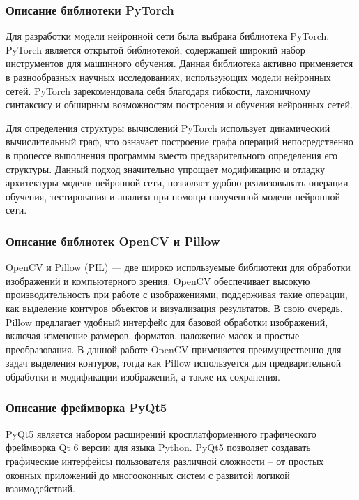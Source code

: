 \subsubsection{Описание библиотеки PyTorch}
	
Для разработки модели нейронной сети была выбрана библиотека PyTorch. PyTorch является открытой библиотекой, содержащей широкий	набор инструментов для машинного обучения. Данная библиотека активно применяется в разнообразных научных исследованиях, использующих модели нейронных сетей. PyTorch зарекомендовала себя благодаря гибкости, лаконичному синтаксису и обширным возможностям построения и обучения нейронных сетей. 

Для определения структуры вычислений PyTorch использует динамический вычислительный граф, что означает построение графа операций непосредственно в процессе выполнения программы вместо предварительного определения его структуры. Данный подход значительно упрощает модификацию и отладку архитектуры модели нейронной сети, позволяет удобно реализовывать операции обучения, тестирования и анализа при помощи полученной модели нейронной сети. 

\subsubsection{Описание библиотек OpenCV и Pillow}

OpenCV и Pillow (PIL) — две широко используемые библиотеки для обработки изображений и компьютерного зрения. OpenCV обеспечивает высокую производительность при работе с изображениями, поддерживая такие операции, как выделение контуров объектов и визуализация результатов. В свою очередь, Pillow предлагает удобный интерфейс для базовой обработки изображений, включая изменение размеров, форматов, наложение масок и простые преобразования. В данной работе OpenCV применяется преимущественно для задач выделения контуров, тогда как Pillow используется для предварительной обработки и модификации изображений, а также их сохранения. 

\subsubsection{Описание фреймворка PyQt5}

PyQt5 является набором расширений кросплатформенного графического фреймворка Qt 6 версии для языка Python. PyQt5 позволяет создавать графические интерфейсы пользователя различной сложности -- от простых оконных приложений до многооконных систем с развитой логикой взаимодействий. 


